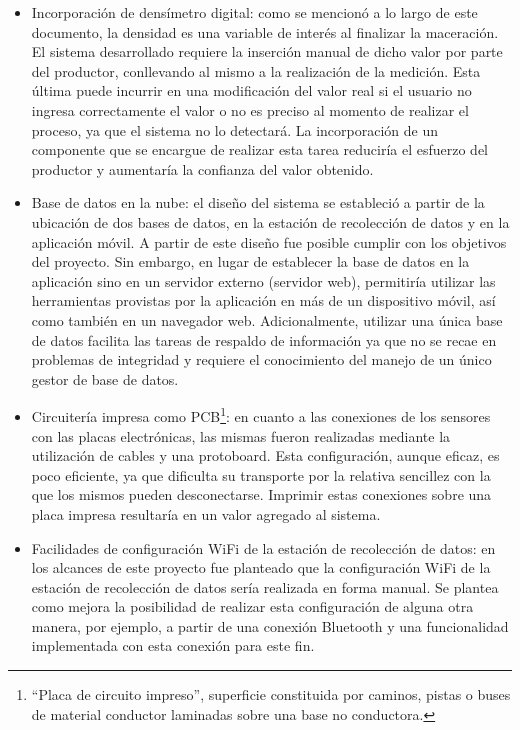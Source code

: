 \begin{itemize}
    \item Incorporación de densímetro digital: como se mencionó a lo largo de este documento, la densidad es una variable de interés al finalizar la maceración. El sistema desarrollado requiere la inserción manual de dicho valor por parte del productor, conllevando al mismo a la realización de la medición. Esta última puede incurrir en una modificación del valor real si el usuario no ingresa correctamente el valor o no es preciso al momento de realizar el proceso, ya que el sistema no lo detectará. La incorporación de un componente que se encargue de realizar esta tarea reduciría el esfuerzo del productor y aumentaría la confianza del valor obtenido. 
    
    \item Base de datos en la nube: el diseño del sistema se estableció a partir de la ubicación de dos bases de datos, en la estación de recolección de datos y en la aplicación móvil. A partir de este diseño fue posible cumplir con los objetivos del proyecto. Sin embargo, en lugar de establecer la base de datos en la aplicación sino en un servidor externo (servidor web), permitiría utilizar las herramientas provistas por la aplicación en más de un dispositivo móvil, así como también en un navegador web. Adicionalmente, utilizar una única base de datos facilita las tareas de respaldo de información ya que no se recae en problemas de integridad y requiere el conocimiento del manejo de un único gestor de base de datos.
    
    \item Circuitería impresa como PCB\footnote{“Placa de circuito impreso”, superficie constituida por caminos, pistas o buses de material conductor laminadas sobre una base no conductora.}: en cuanto a las conexiones de los sensores con las placas electrónicas, las mismas fueron realizadas mediante la utilización de cables y una protoboard. Esta configuración, aunque eficaz, es poco eficiente, ya que dificulta su transporte por la relativa sencillez con la que los mismos pueden desconectarse. Imprimir estas conexiones sobre una placa impresa resultaría en un valor agregado al sistema.
    
    \item Facilidades de configuración WiFi\textsuperscript{\textregistered} de la estación de recolección de datos: en los alcances de este proyecto fue planteado que la configuración WiFi\textsuperscript{\textregistered} de la estación de recolección de datos sería realizada en forma manual. Se plantea como mejora la posibilidad de realizar esta configuración de alguna otra manera, por ejemplo, a partir de una conexión Bluetooth\textsuperscript{\textregistered} y una funcionalidad implementada con esta conexión para este fin.


\end{itemize}
